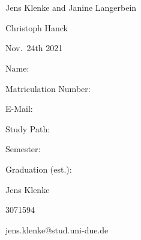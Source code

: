 \documentclass[12pt,a4paper]{article}
\begin{document}
\begin{titlepage}
\begin{center}
  \large{  \\}
  \vspace{0.75cm}
  \large{}\\
  \vspace{0.5cm}
  Jens Klenke and Janine Langerbein\\
  \end{center}
  \vfill
  \hrulefill

  \noindent\begin{minipage}[t]{0.3\textwidth}
  \end{minipage}
  \begin{minipage}[t]{0.7\textwidth}
  \hspace{1cm}Christoph Hanck
  \end{minipage}

  \noindent\begin{minipage}[t]{0.3\textwidth}
  \end{minipage}
  \begin{minipage}[t]{0.7\textwidth}
  \hspace{1cm}Nov.~24th 2021
  \end{minipage}

  \hrulefill

  \begin{multicols}{3}
  
  \begin{scriptsize}
  
  Name:

  Matriculation Number:

  E-Mail:

  Study Path:

  Semester:

  Graduation (est.):
 
  \columnbreak

  Jens Klenke

  3071594
  
  jens.klenke@stud.uni-due.de


\end{scriptsize}
\end{multicols}
\end{titlepage}
\end{document}
